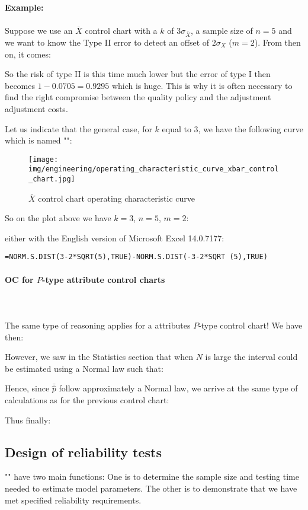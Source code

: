  	\begin{tcolorbox}[colframe=black,colback=white,sharp corners]
	\textbf{{\Large {}}Example:}\\\\
	Suppose we use an $\bar{X}$ control chart with a $k$ of $3\sigma_{\bar{X}}$, a sample size of $n=5$ and we want to know the Type II error to detect an offset of $2\sigma_X$ ($m=2$). From then on, it comes:
	
	So the risk of type II is this time much lower but the error of type I then becomes $1-0.0705 = 0.9295$ which is huge. This is why it is often necessary to find the right compromise between the quality policy and the adjustment adjustment costs.
	\end{tcolorbox}
	Let us indicate that the general case, for $k$ equal to $3$, we have the following curve which is named "":
	 \begin{figure}[H]
		\centering
		\texttt{[image: img/engineering/operating\_characteristic\_curve\_xbar\_control\_chart.jpg]}
		\caption{$\bar{X}$ control chart operating characteristic curve}
	\end{figure}
	So on the plot above we have $k=3$, $n=5$, $m=2$:
	
 	either with the English version of Microsoft Excel 14.0.7177:
	\begin{center}
		\texttt{=NORM.S.DIST(3-2*SQRT(5),TRUE)-NORM.S.DIST(-3-2*SQRT (5),TRUE)}
	\end{center}
	
	\paragraph{OC for $P$-type attribute control charts}\mbox{}\\\\
	The same type of reasoning applies for a attributes $P$-type control chart! We have then:
	
	However, we saw in the Statistics section that when $N$ is large the interval could be estimated using a Normal law such that:
	
 	Hence, since $\bar{\hat{p}}$ follow approximately a Normal law, we arrive at the same type of calculations as for the previous control chart:
	
	Thus finally:
	
	
	 \pagebreak
	 \subsection{Design of reliability tests}
	 "" have two main functions: One is to determine the sample size and testing time needed to estimate model parameters. The other is to demonstrate that we have met specified reliability requirements.

